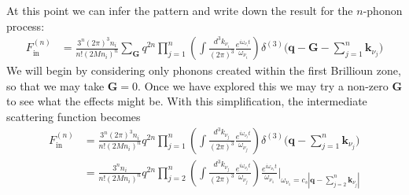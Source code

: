 \documentclass{article}
\begin{document}
At this point we can infer the pattern and write down the result for the $n$-phonon process:
\begin{align}
F_\text{in}^{(n)} &= \frac{3^n (2 \pi)^3 n_i}{n!(2 Mn_i)^n} \sum_\textbf{G} q^{2 n} \prod_{j = 1}^n \left( \int\frac{d^3 k_{\nu_i}}{(2 \pi)^3} \frac{e^{i\omega_{\nu_i} t}}{\omega_{\nu_i}}  \right) \delta^{(3)}\bigg(\textbf{q} - \textbf{G} - \sum_{j = 1}^n \textbf{k}_{\nu_j} \bigg)
\end{align}
We will begin by considering only phonons created within the first Brillioun zone, so that we may take $\textbf{G} = 0$. Once we have explored this we may try a non-zero $\textbf{G}$ to see what the effects might be. With this simplification, the intermediate scattering function becomes
\begin{align}
F_\text{in}^{(n)} &= \frac{3^n (2 \pi)^3 n_i}{n!(2 Mn_i)^n} q^{2 n} \prod_{j = 1}^n \left( \int\frac{d^3 k_{\nu_j}}{(2 \pi)^3} \frac{e^{i\omega_{\nu_j} t}}{\omega_{\nu_j}}  \right) \delta^{(3)}\bigg(\textbf{q} - \sum_{j = 1}^n \textbf{k}_{\nu_j} \bigg) \nonumber\\
&= \frac{3^n n_i}{n!(2 Mn_i)^n} q^{2 n} \prod_{j = 2}^n \left( \int\frac{d^3 k_{\nu_j}}{(2 \pi)^3} \frac{e^{i\omega_{\nu_j} t}}{\omega_{\nu_j}}  \right) \frac{e^{i\omega_{\nu_1}t}}{\omega_{\nu_1}} \bigg|_{\omega_{\nu_1} = c_s|\textbf{q} - \sum_{j = 2}^{n}\textbf{k}_{\nu_j}|}
\end{align}
\end{document}

